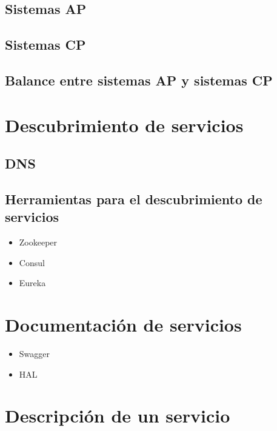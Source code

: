 \documentclass[11pt,a4paper]{article}
\begin{document}
\subsection{Sistemas AP}

\subsection{Sistemas CP}

\subsection{Balance entre sistemas AP y sistemas CP}

\section{Descubrimiento de servicios}

\subsection{DNS}

\subsection{Herramientas para el descubrimiento de servicios}

\begin{itemize}
\item Zookeeper
\item Consul
\item Eureka
\end{itemize}

\section{Documentación de servicios}

\begin{itemize}
\item Swagger
\item HAL
\end{itemize}

\section{Descripción de un servicio}
\end{document}
